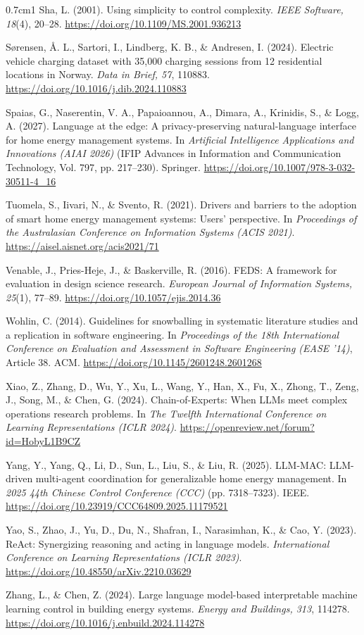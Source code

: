 \begin{hangparas}{0.7cm}{1}
Sha, L. (2001). Using simplicity to control complexity. \textit{IEEE
Software, 18}(4), 20--28. \url{https://doi.org/10.1109/MS.2001.936213}

Sørensen, Å. L., Sartori, I., Lindberg, K. B., \& Andresen, I. (2024).
Electric vehicle charging dataset with 35,000 charging sessions from 12
residential locations in Norway. \textit{Data in Brief, 57}, 110883.
\url{https://doi.org/10.1016/j.dib.2024.110883}

Spaias, G., Naserentin, V. A., Papaioannou, A., Dimara, A., Krinidis,
S., \& Logg, A. (2027). Language at the edge: A privacy-preserving
natural-language interface for home energy management systems. In
\textit{Artificial Intelligence Applications and Innovations (AIAI
2026)} (IFIP Advances in Information and Communication Technology, Vol.
797, pp. 217--230). Springer.
\url{https://doi.org/10.1007/978-3-032-30511-4_16}

Tuomela, S., Iivari, N., \& Svento, R. (2021). Drivers and barriers to
the adoption of smart home energy management systems: Users'
perspective. In \textit{Proceedings of the Australasian Conference on
Information Systems (ACIS 2021)}.
\url{https://aisel.aisnet.org/acis2021/71}

Venable, J., Pries-Heje, J., \& Baskerville, R. (2016). FEDS: A
framework for evaluation in design science research. \textit{European
Journal of Information Systems, 25}(1), 77--89.
\url{https://doi.org/10.1057/ejis.2014.36}

Wohlin, C. (2014). Guidelines for snowballing in systematic literature
studies and a replication in software engineering. In
\textit{Proceedings of the 18th International Conference on Evaluation
and Assessment in Software Engineering (EASE '14)}, Article 38. ACM.
\url{https://doi.org/10.1145/2601248.2601268}

Xiao, Z., Zhang, D., Wu, Y., Xu, L., Wang, Y., Han, X., Fu, X., Zhong,
T., Zeng, J., Song, M., \& Chen, G. (2024). Chain-of-Experts: When LLMs
meet complex operations research problems. In \textit{The Twelfth
International Conference on Learning Representations (ICLR 2024)}.
\url{https://openreview.net/forum?id=HobyL1B9CZ}

Yang, Y., Yang, Q., Li, D., Sun, L., Liu, S., \& Liu, R. (2025).
LLM-MAC: LLM-driven multi-agent coordination for generalizable home
energy management. In \textit{2025 44th Chinese Control Conference
(CCC)} (pp. 7318--7323). IEEE.
\url{https://doi.org/10.23919/CCC64809.2025.11179521}

Yao, S., Zhao, J., Yu, D., Du, N., Shafran, I., Narasimhan, K., \& Cao,
Y. (2023). ReAct: Synergizing reasoning and acting in language models.
\textit{International Conference on Learning Representations (ICLR
2023)}. \url{https://doi.org/10.48550/arXiv.2210.03629}

Zhang, L., \& Chen, Z. (2024). Large language model-based interpretable
machine learning control in building energy systems. \textit{Energy and
Buildings, 313}, 114278.
\url{https://doi.org/10.1016/j.enbuild.2024.114278}

\end{hangparas}

